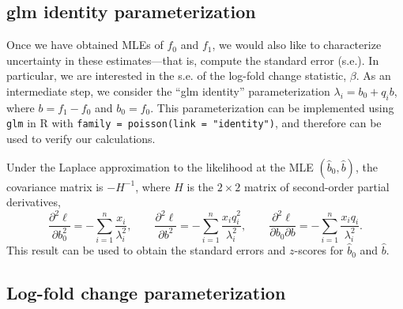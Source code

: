 \documentclass[final]{siamart171218}
\begin{document}
\subsection{glm identity parameterization}

Once we have obtained MLEs of $f_0$ and $f_1$, we would also like to
characterize uncertainty in these estimates---that is, compute the
standard error (s.e.). In particular, we are interested in the s.e. of
the log-fold change statistic, $\beta$. As an intermediate step, we
consider the ``glm identity'' parameterization $\lambda_i = b_0 + q_i
b$, where $b = f_1 - f_0$ and $b_0 = f_0$. This parameterization can
be implemented using {\tt glm} in R with {\tt family = poisson(link =
  "identity")}, and therefore can be used to verify our calculations.

Under the Laplace approximation to the likelihood at the MLE
$(\hat{b}_0, \hat{b})$, the covariance matrix is $-H^{-1}$, where $H$
is the $2 \times 2$ matrix of second-order partial derivatives,
\begin{equation*}
\frac{\partial^2\ell}{\partial b_0^2} = 
-\sum_{i=1}^n \frac{x_i}{\lambda_i^2}, \qquad
\frac{\partial^2\ell}{\partial b^2} = 
-\sum_{i=1}^n \frac{x_i q_i^2}{\lambda_i^2}, \qquad
\frac{\partial^2\ell}{\partial b_0 \partial b} = 
-\sum_{i=1}^n \frac{x_i q_i}{\lambda_i^2}.
\end{equation*}
This result can be used to obtain the standard errors and $z$-scores
for $\hat{b}_0$ and $\hat{b}$.

\subsection{Log-fold change parameterization}
\end{document}
